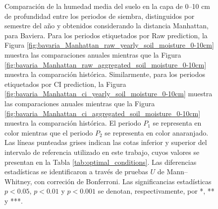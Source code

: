 \begin{figure}[htbp]
	\caption{
		Comparación de la humedad media del suelo en la capa de 0--10 cm de profundidad entre los periodos de siembra, distinguidos por semestre del año y obtenidos considerando la distancia Manhattan, para Baviera. Para los periodos etiquetados por Raw prediction, la Figura \ref{fig:bavaria_Manhattan_raw_yearly_soil_moisture_0-10cm} muestra las comparaciones anuales mientras que la Figura \ref{fig:bavaria_Manhattan_raw_aggregated_soil_moisture_0-10cm} muestra la comparación histórica. Similarmente, para los periodos etiquetados por CI prediction, la Figura \ref{fig:bavaria_Manhattan_ci_yearly_soil_moisture_0-10cm} muestra las comparaciones anuales mientras que la Figura \ref{fig:bavaria_Manhattan_ci_aggregated_soil_moisture_0-10cm} muestra la comparación histórica. El periodo $P_1$ se representa en color mientras que el periodo $P_2$ se representa en color anaranjado. Las líneas punteadas grises indican las cotas inferior y superior del intervalo de referencia utilizado en este trabajo, cuyos valores se presentan en la Tabla \ref{tab:optimal_conditions}. Las diferencias estadísticas se identificaron a través de pruebas $U$ de Mann--Whitney, con correción de Bonferroni. Las significancias estadísticas $p<0.05$, $p<0.01$ y $p<0.001$ se denotan, respectivamente, por *, ** y ***.
	}
	\label{fig:bavaria_Manhattan_soil_moisture_0-10cm}
	
	
\end{figure}


